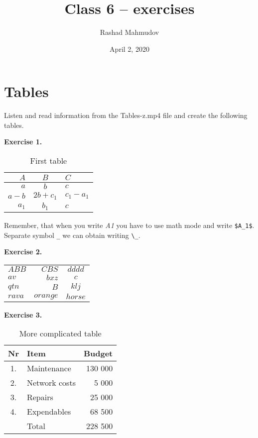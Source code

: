 \documentclass{article}
\title{Class 6 – exercises}
\author{Rashad Mahmudov }
\date{April 2, 2020}
\begin{document}
\maketitle
\section{Tables}
Listen and read information from the Tables-z.mp4 file and create the following
tables.

\newcommand{\exercise}{\vspace{3.8mm}\noindent\textbf}

\exercise{Exercise 1.}

\begin{table}[h]
\centering
\begin{tabular}[t]{|r|c|l|}
 \hline
 $A$ & $B$ & $C$ \\ 
 \hline
 $a$ & $b$ & $c$ \\
 \hline
 $a-b$ & $2b+c_1$ & $c_1-a_1$ \\ 
 \hline
 $a_1$ & $b_1$ & $c$ \\ 
 \hline
\end{tabular}
\caption{First table}
\end{table}
Remember, that when you write \emph{A1} you have to use math mode and write
\verb|$A_1$|. Separate symbol \verb|_| we can obtain writing \verb|\_|.

\exercise{Exercise 2.}
\begin{table}[h]
\centering
\begin{tabular}{|l|r|c|}
 \hline
 $ABB$ & $CBS$ & $dddd$ \\ 
 $av$ & $bxz$ & $c$ \\ 
 $qtn$ & $B$ & $klj$ \\ 
 $rava$ & $orange$ & $horse$ \\ 
 \hline
\end{tabular}
\end{table}

\exercise{Exercise 3.}

\begin{table}[h!]
\centering
\begin{tabular}{|c|l||r|}
 \hline
 Nr & Item & Budget \\ 
 \hline
 \hline
 1. & Maintenance & 130 000 \\
 \hline
 2. & Network costs & 5 000 \\ 
 \hline
 3. &  Repairs & 25 000 \\
  \hline
 4. & Expendables & 68 500 \\ 
 \hline
 \hline
  & Total & 228 500 \\ 
 \hline
\end{tabular}
\caption{More complicated table}
\end{table}
\end{document}
